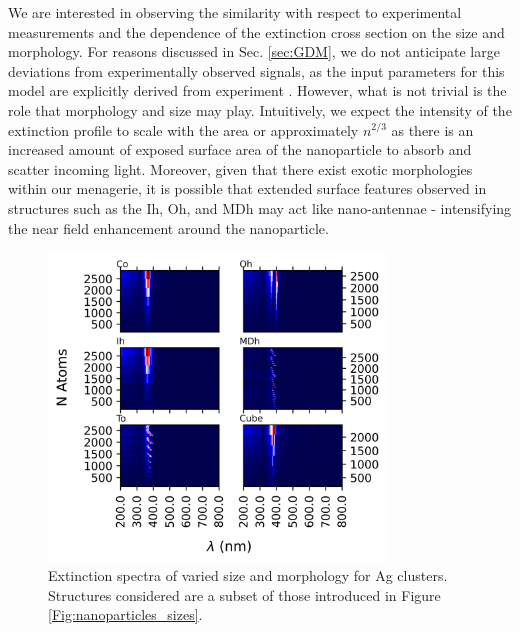 We are interested in observing the similarity with respect to experimental measurements and the dependence of the extinction cross section on the size and morphology. For reasons discussed in Sec. \ref{sec:GDM}, we do not anticipate large deviations from experimentally observed signals, as the input parameters for this model are explicitly derived from experiment \cite{pyGDM}. However, what is not trivial is the role that morphology and size may play. Intuitively, we expect the intensity of the extinction profile to scale with the area or approximately $n^{2/3}$ as there is an increased amount of exposed surface area of the nanoparticle to absorb and scatter incoming light. Moreover, given that there exist exotic morphologies within our menagerie, it is possible that extended surface features observed in structures such as the Ih, Oh, and MDh may act like nano-antennae - intensifying the near field enhancement around the nanoparticle.

\begin{figure}[b]
    \includegraphics[width=0.8\textwidth]{figures/LM/GDM/Ag_Specs.png}
    \caption{Extinction spectra of varied size and morphology for Ag clusters. Structures considered are a subset of those introduced in Figure \ref{Fig:nanoparticles_sizes}.} 
    \label{Fig:Size_Ag_GDM}
\end{figure}

